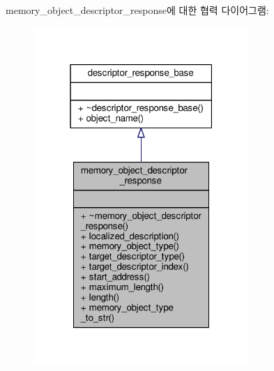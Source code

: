 memory\+\_\+object\+\_\+descriptor\+\_\+response에 대한 협력 다이어그램\+:
\nopagebreak
\begin{figure}[H]
\begin{center}
\leavevmode
\includegraphics[width=232pt]{classavdecc__lib_1_1memory__object__descriptor__response__coll__graph}
\end{center}
\end{figure}
